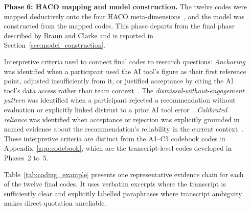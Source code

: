 \documentclass[a4paper,twoside]{bth}
\begin{document}
\textbf{Phase 6: HACO mapping and model construction.} The twelve codes were mapped deductively onto the four HACO meta-dimensions~\cite{dubey2020haco}, and the model was constructed from the mapped codes. This phase departs from the final phase described by Braun and Clarke and is reported in Section~\ref{sec:model_construction}.

Interpretive criteria used to connect final codes to research questions: \textit{Anchoring} was identified when a participant used the AI tool's figure as their first reference point, adjusted insufficiently from it, or justified acceptance by citing the AI tool's data access rather than team context~\cite{mohanani2018cognitive}\cite[pp.~119--128]{kahneman2011thinking}. The \textit{dismissal-without-engagement pattern} was identified when a participant rejected a recommendation without evaluation or explicitly linked distrust to a prior AI tool error~\cite{dietvorst2015algorithm}. \textit{Calibrated reliance} was identified when acceptance or rejection was explicitly grounded in named evidence about the recommendation's reliability in the current context~\cite{lee2004trust}. These interpretive criteria are distinct from the A1--C5 codebook codes in Appendix~\ref{app:codebook}, which are the transcript-level codes developed in Phases~2 to~5.

Table~\ref{tab:coding_example} presents one representative evidence chain for each of the twelve final codes. It uses verbatim excerpts where the transcript is sufficiently clear and explicitly labelled paraphrases where transcript ambiguity makes direct quotation unreliable.
\end{document}
